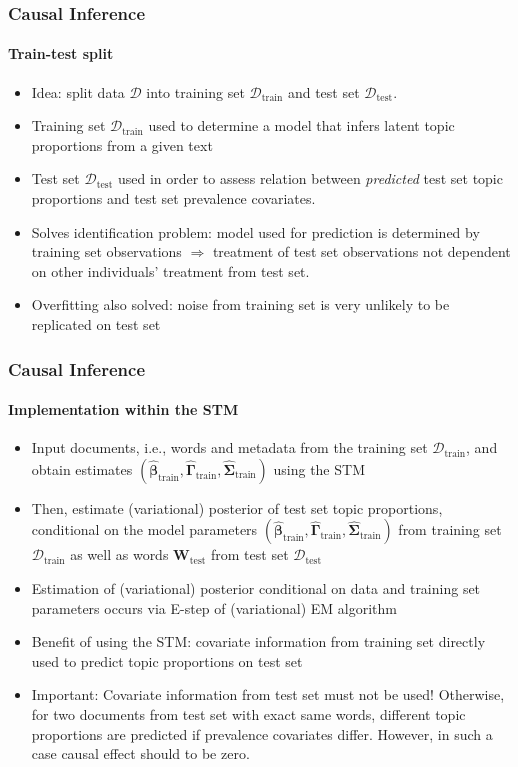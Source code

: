 \documentclass[xcolor=dvipsnames]{beamer}
\begin{document}
\begin{frame}
\frametitle{Causal Inference}
\framesubtitle{Train-test split}
\begin{itemize}
\item Idea: split data $\mathcal{D}$ into training set $\mathcal{D}_{\text{train}}$ and test set $\mathcal{D}_{\text{test}}$. 
\item Training set $\mathcal{D}_{\text{train}}$ used to determine a model that infers latent topic proportions from a given text 
\item Test set $\mathcal{D}_{\text{test}}$ used in order to assess relation between \textit{predicted} test set topic proportions and test set prevalence covariates.
\item Solves identification problem: model used for prediction is determined by training set observations $\Rightarrow$ treatment of test set observations not dependent on other individuals' treatment from test set. 
\item Overfitting also solved: noise from training set is very unlikely to be replicated on test set
\end{itemize}
\end{frame}

\begin{frame}
\frametitle{Causal Inference}
\framesubtitle{Implementation within the STM}
\begin{itemize}
\item Input documents, i.e., words and metadata from the training set $\mathcal{D}_{\text{train}}$, and obtain estimates $(\hat{\boldsymbol{\beta}}_{\text{train}}, \hat{\boldsymbol{\Gamma}}_{\text{train}}, \hat{\boldsymbol{\Sigma}}_{\text{train}})$ using the STM
\item Then, estimate (variational) posterior of test set topic proportions, conditional on the model parameters $(\hat{\boldsymbol{\beta}}_{\text{train}}, \hat{\boldsymbol{\Gamma}}_{\text{train}}, \hat{\boldsymbol{\Sigma}}_{\text{train}})$ from training set $\mathcal{D}_{\text{train}}$ as well as words $\boldsymbol{W}_{\text{test}}$ from test set $\mathcal{D}_{\text{test}}$
\item Estimation of (variational) posterior conditional on data and training set parameters occurs via E-step of (variational) EM algorithm
\item Benefit of using the STM: covariate information from training set directly used to predict topic proportions on test set
\item Important: Covariate information from test set must not be used! Otherwise, for two documents from test set with exact same words, different topic proportions are predicted if prevalence covariates differ. However, in such a case causal effect should to be zero.
\end{itemize}
\end{frame}
\end{document}
